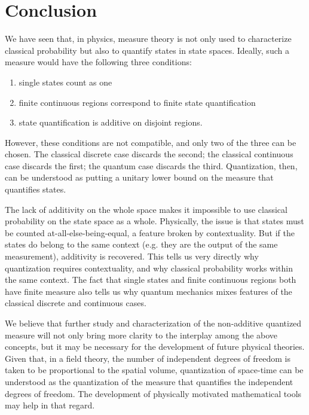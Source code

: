 \documentclass[entropy,article,submit,pdftex,moreauthors]{Definitions/mdpi}
\begin{document}
\section{Conclusion}

We have seen that, in physics, measure theory is not only used to characterize classical probability but also to quantify states in state spaces. Ideally, such a measure would have the following three conditions:
\begin{enumerate}
	\item single states count as one
	\item finite continuous regions correspond to finite state quantification
	\item state quantification is additive on disjoint regions.
\end{enumerate}
However, these conditions are not compatible, and only two of the three can be chosen. The classical discrete case discards the second; the classical continuous case discards the first; the quantum case discards the third. Quantization, then, can be understood as putting a unitary lower bound on the measure that quantifies states.

The lack of additivity on the whole space makes it impossible to use classical probability on the state space as a whole. Physically, the issue is that states must be counted at-all-else-being-equal, a feature broken by contextuality. But if the states do belong to the same context (e.g. they are the output of the same measurement), additivity is recovered. This tells us very directly why quantization requires contextuality, and why classical probability works within the same context. The fact that single states and finite continuous regions both have finite measure also tells us why quantum mechanics mixes features of the classical discrete and continuous cases.

We believe that further study and characterization of the non-additive quantized measure will not only bring more clarity to the interplay among the above concepts, but it may be necessary for the development of future physical theories. Given that, in a field theory, the number of independent degrees of freedom is taken to be proportional to the spatial volume, quantization of space-time can be understood as the quantization of the measure that quantifies the independent degrees of freedom. The development of physically motivated mathematical tools may help in that regard.



\vspace{6pt} 
\end{document}
